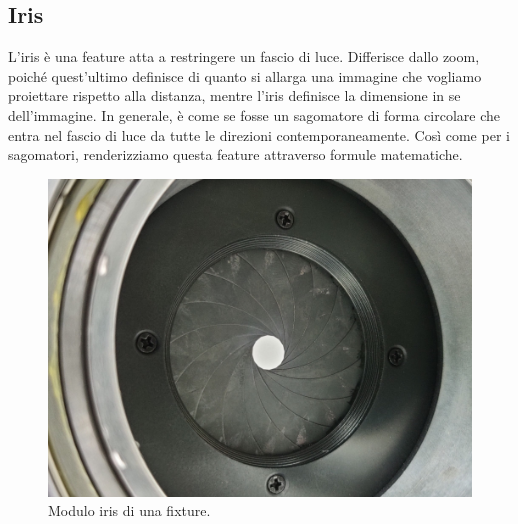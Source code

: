 \documentclass[main.tex]{subfiles}
\begin{document}
\subsection{Iris}\label{subsec:5_Iris}
L'iris è una feature atta a restringere un fascio di luce. Differisce dallo zoom, poiché quest'ultimo definisce di quanto si allarga una immagine che vogliamo proiettare rispetto alla distanza, mentre l'iris definisce la dimensione in se dell'immagine. In generale, è come se fosse un sagomatore di forma circolare che entra nel fascio di luce da tutte le direzioni contemporaneamente. Così come per i sagomatori, renderizziamo questa feature attraverso formule matematiche.
\begin{figure}[H]
    \centering
    \includegraphics[width=.75\linewidth]{img/newFeatures/Iris.jpg}
    \caption{Modulo iris di una fixture.}
    \label{fig:5_iris}
\end{figure}
\end{document}
